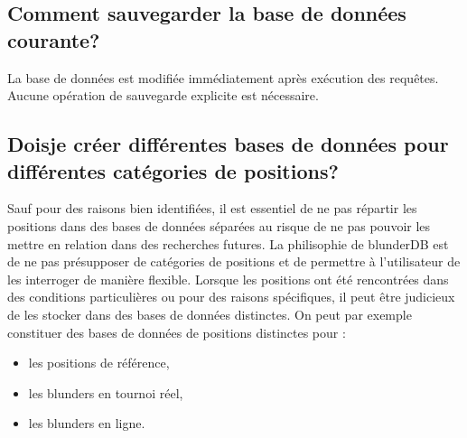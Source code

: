 \documentclass[letterpaper,10pt,french]{sphinxmanual}
\begin{document}
\subsection{Comment sauvegarder la base de données courante?}
\label{\detokenize{faq:comment-sauvegarder-la-base-de-donnees-courante}}
\sphinxAtStartPar
La base de données est modifiée immédiatement après exécution des requêtes.
Aucune opération de sauvegarde explicite est nécessaire.


\subsection{Dois\sphinxhyphen{}je créer différentes bases de données pour différentes catégories de positions?}
\label{\detokenize{faq:dois-je-creer-differentes-bases-de-donnees-pour-differentes-categories-de-positions}}
\sphinxAtStartPar
Sauf pour des raisons bien identifiées, il est essentiel de ne pas
répartir les positions dans des bases de données séparées au risque
de ne pas pouvoir les mettre en relation dans des recherches futures.
La philisophie de blunderDB est de ne pas présupposer de catégories de
positions  et de permettre à l’utilisateur de les interroger
de manière flexible. Lorsque les positions ont été rencontrées dans des conditions
particulières ou pour des raisons spécifiques, il peut être judicieux de les
stocker dans des bases de données distinctes.
On peut par exemple constituer des bases de données de positions distinctes
pour :
\begin{itemize}
\item {} 
\sphinxAtStartPar
les positions de référence,

\item {} 
\sphinxAtStartPar
les blunders en tournoi réel,

\item {} 
\sphinxAtStartPar
les blunders en ligne.

\end{itemize}
\end{document}

